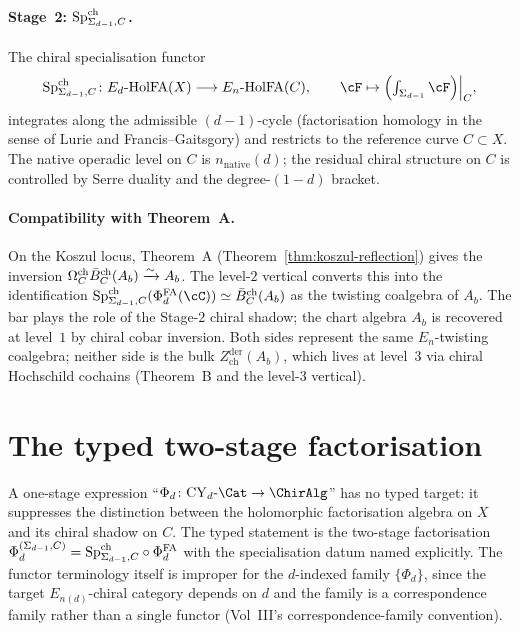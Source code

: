 \paragraph{Stage~2: $\mathrm{Sp}^{\mathrm{ch}}_{\Sigma_{d-1},C}$.}
The chiral specialisation functor
\[
 \SpCh_{\Sigma_{d-1},C}\colon \EdHolFA(X)\longrightarrow \EnHolFA(C),
 \qquad
 \cF\mapsto\Bigl(\textstyle\int_{\Sigma_{d-1}}\cF\Bigr)\Big|_C ,
\]
integrates along the admissible $(d{-}1)$-cycle (factorisation homology
in the sense of Lurie and Francis--Gaitsgory) and restricts to the
reference curve $C\subset X$. The native operadic level on $C$ is
$n_{\mathrm{native}}(d)$; the residual chiral structure on $C$ is
controlled by Serre duality and the degree-$(1-d)$ bracket.

\paragraph{Compatibility with Theorem~A.}
On the Koszul locus, Theorem~A
(Theorem~\ref{thm:koszul-reflection}) gives the inversion
$\Omega^{\mathrm{ch}}_C\bar{B}^{\mathrm{ch}}_C(A_b)\xrightarrow{\sim}A_b$. The
level-$2$ vertical converts this into the identification
$\SpCh_{\Sigma_{d-1},C}(\PhiFA_d(\cC))\simeq \Bbarch_C(A_b)$ as the
twisting coalgebra of $A_b$. The bar plays the role of the Stage-$2$
chiral shadow; the chart algebra $A_b$ is recovered at level~$1$ by
chiral cobar inversion. Both sides represent the same $E_n$-twisting
coalgebra; neither side is the bulk
$Z^{\mathrm{der}}_{\mathrm{ch}}(A_b)$, which lives at level~$3$ via
chiral Hochschild cochains (Theorem~B and the level-$3$ vertical).

\section{The typed two-stage factorisation}
\label{sec:vert-level-2-two-stage-typed}

A one-stage expression
``$\Phi_d\colon\CY_d\text{-}\Cat\to\ChirAlg$'' has no typed target:
it suppresses the distinction between the holomorphic factorisation
algebra on $X$ and its chiral shadow on $C$. The typed statement is the
two-stage factorisation
$\Phi_d^{(\Sigma_{d-1},C)}=\mathrm{Sp}^{\mathrm{ch}}_{\Sigma_{d-1},C}\circ\Phi^{\mathrm{FA}}_d$ with
the specialisation datum named explicitly. The functor terminology
itself is improper for the $d$-indexed family $\{\Phi_d\}$, since the
target $E_{n(d)}$-chiral category depends on $d$ and the family is a
correspondence family rather than a single functor (Vol~III's
correspondence-family convention).

